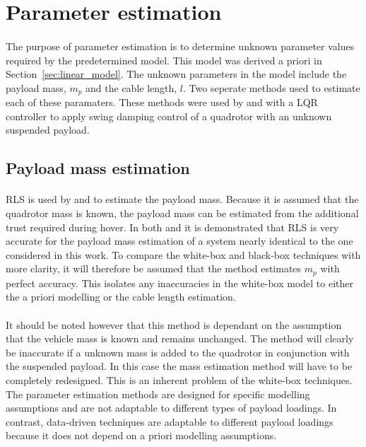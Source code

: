 \section{Parameter estimation} \label{sec:param_estimation}

    \paragraph{}
    The purpose of parameter estimation is to determine unknown parameter values required by the predetermined model.
    This model was derived a priori in Section~\ref{sec:linear_model}.
    The unknown parameters in the model include the payload mass, $m_p$ and the cable length, $l$.
    Two seperate methods used to estimate each of these paramaters.
    These methods were used by \cite{Erasmus2020} and \cite{Slabber2020} 
    with a LQR controller to apply swing damping control of a quadrotor with an unknown suspended payload.
    
\subsection{Payload mass estimation}

    \paragraph{}
    RLS is used by \cite{Erasmus2020} and \cite{Slabber2020} to estimate the payload mass.
    Because it is assumed that the quadrotor mass is known, 
    the payload mass can be estimated from the additional trust required during hover.
    In both \cite{Erasmus2020} and \cite{Slabber2020} it is demonstrated 
    that RLS is very accurate for the payload mass estimation of a system nearly identical to the one considered in this work.
    To compare the white-box and black-box techniques with more clarity, 
    it will therefore be assumed that the method estimates $m_p$ with perfect accuracy.
    This isolates any inaccuracies in the white-box model to 
    either the a priori modelling or the cable length estimation.

    \paragraph{}
    It should be noted however that this method is dependant on the assumption 
    that the vehicle mass is known and remains unchanged.
    The method will clearly be inaccurate if a unknown mass is added to the quadrotor 
    in conjunction with the suspended payload.
    In this case the mass estimation method will have to be completely redesigned.
    This is an inherent problem of the white-box techniques.
    The parameter estimation methods are designed for specific modelling assumptions 
    and are not adaptable to different types of payload loadings.
    In contrast, data-driven techniques are adaptable to different payload loadings 
    because it does not depend on a priori modelling assumptions.

